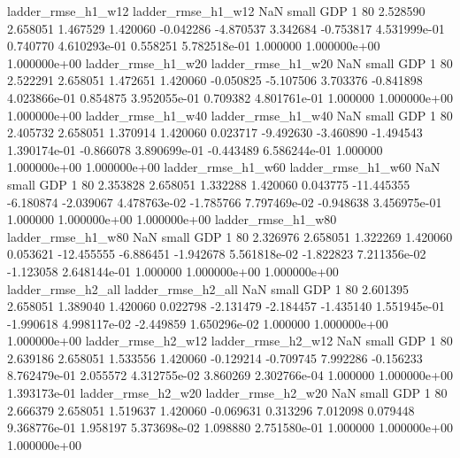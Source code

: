       ladder_rmse_h1_w12       ladder_rmse_h1_w12                   NaN      small      GDP                 1 80 2.528590       2.658051 1.467529       1.420060   -0.042286     -4.870537      3.342684    -0.753817   4.531999e-01  0.740770 4.610293e-01     0.558251   5.782518e-01            1.000000    1.000000e+00        1.000000e+00
      ladder_rmse_h1_w20       ladder_rmse_h1_w20                   NaN      small      GDP                 1 80 2.522291       2.658051 1.472651       1.420060   -0.050825     -5.107506      3.703376    -0.841898   4.023866e-01  0.854875 3.952055e-01     0.709382   4.801761e-01            1.000000    1.000000e+00        1.000000e+00
      ladder_rmse_h1_w40       ladder_rmse_h1_w40                   NaN      small      GDP                 1 80 2.405732       2.658051 1.370914       1.420060    0.023717     -9.492630     -3.460890    -1.494543   1.390174e-01 -0.866078 3.890699e-01    -0.443489   6.586244e-01            1.000000    1.000000e+00        1.000000e+00
      ladder_rmse_h1_w60       ladder_rmse_h1_w60                   NaN      small      GDP                 1 80 2.353828       2.658051 1.332288       1.420060    0.043775    -11.445355     -6.180874    -2.039067   4.478763e-02 -1.785766 7.797469e-02    -0.948638   3.456975e-01            1.000000    1.000000e+00        1.000000e+00
      ladder_rmse_h1_w80       ladder_rmse_h1_w80                   NaN      small      GDP                 1 80 2.326976       2.658051 1.322269       1.420060    0.053621    -12.455555     -6.886451    -1.942678   5.561818e-02 -1.822823 7.211356e-02    -1.123058   2.648144e-01            1.000000    1.000000e+00        1.000000e+00
      ladder_rmse_h2_all       ladder_rmse_h2_all                   NaN      small      GDP                 1 80 2.601395       2.658051 1.389040       1.420060    0.022798     -2.131479     -2.184457    -1.435140   1.551945e-01 -1.990618 4.998117e-02    -2.449859   1.650296e-02            1.000000    1.000000e+00        1.000000e+00
      ladder_rmse_h2_w12       ladder_rmse_h2_w12                   NaN      small      GDP                 1 80 2.639186       2.658051 1.533556       1.420060   -0.129214     -0.709745      7.992286    -0.156233   8.762479e-01  2.055572 4.312755e-02     3.860269   2.302766e-04            1.000000    1.000000e+00        1.393173e-01
      ladder_rmse_h2_w20       ladder_rmse_h2_w20                   NaN      small      GDP                 1 80 2.666379       2.658051 1.519637       1.420060   -0.069631      0.313296      7.012098     0.079448   9.368776e-01  1.958197 5.373698e-02     1.098880   2.751580e-01            1.000000    1.000000e+00        1.000000e+00
